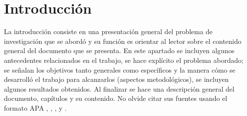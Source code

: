 \chapter{Introducción}



La introducción consiste en una presentación general del problema de 
investigación que se abordó y su función es orientar al lector sobre 
el contenido general del documento que se presenta. En este apartado 
se incluyen algunos antecedentes relacionados en el trabajo, se hace 
explícito el problema abordado; se señalan los objetivos tanto generales 
como específicos y la manera cómo se desarrolló el trabajo para 
alcanzarlos (aspectos metodológicos), se incluyen algunos resultados 
obtenidos. Al finalizar se hace una descripción general del documento, 
capítulos y su contenido. No olvide citar sus fuentes usando el formato 
\gls{APA} \cite{style2020apa}, \cite{wiki:Plagiarism}, \cite{Grätzer2014}, y \cite{Goniwada2022}.
